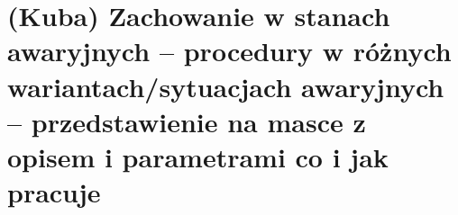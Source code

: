\section{(Kuba) Zachowanie w stanach awaryjnych – procedury w różnych wariantach/sytuacjach
awaryjnych – przedstawienie na masce z opisem i parametrami co i jak
pracuje}